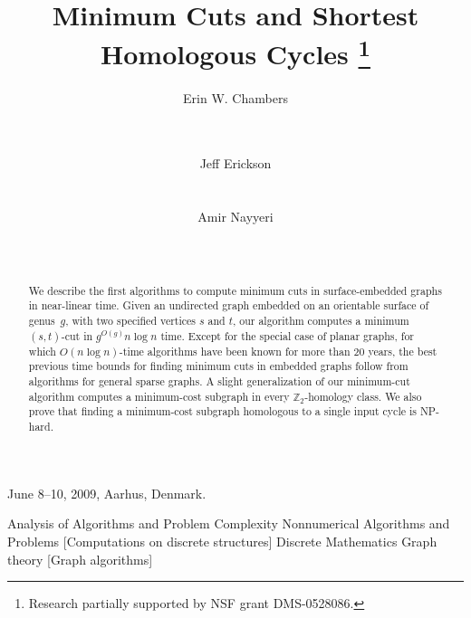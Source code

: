 \documentclass{sig-alternate}
\def\Z{\mathbb{Z}}
\begin{document}
 {June 8--10, 2009, Aarhus, Denmark.} 

\title{Minimum Cuts and Shortest Homologous Cycles%
	\huge\thanks{Research partially supported by NSF grant DMS-0528086.}}

\author{
    Erin W. Chambers
    \\[0.5ex]
	\\
	\\
\alignauthor
    \and
	Jeff Erickson\\[0.5ex]
	\\
    \\
\alignauthor
	Amir Nayyeri\\[0.5ex]
	\\
    \\
}
\maketitle

\begin{abstract}
We describe the first algorithms to compute minimum cuts in surface-embedded graphs in near-linear time.  Given an undirected graph embedded on an orientable surface of genus~$g$, with two specified vertices $s$ and $t$, our algorithm computes a minimum $(s,t)$-cut in $g^{O(g)} n\log n$ time.  Except for the special case of planar graphs, for which $O(n\log n)$-time algorithms have been known for more than 20 years, the best previous time bounds for finding minimum cuts in embedded graphs follow from algorithms for general sparse graphs.  A slight generalization of our minimum-cut algorithm computes a minimum-cost subgraph in every $\Z_2$-homology class.  We also prove that finding a minimum-cost subgraph homologous to a single input cycle is {NP}-hard.
\end{abstract}


{Analysis of Algorithms and Problem Complexity}
{Nonnumerical Algorithms and Problems}
[Computations on discrete structures]
%
{Discrete Mathematics}
{Graph theory}
[Graph algorithms]
\end{document}
